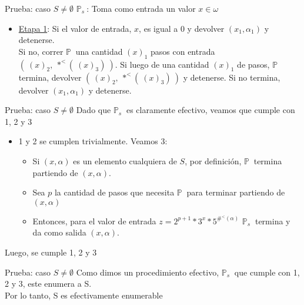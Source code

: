 \documentclass[10pt]{beamer}
\newcommand{\p}{\mathbb{P}}
\begin{document}
\begin{frame}{Prueba: caso $S \neq \emptyset$}
  \underline{$\p_{s}\ $}: Toma como entrada un valor $x \in \omega$
  \begin{itemize}[<+->]
    \item[ ] \underline{Etapa 1}: Si el valor de entrada, $x$, es igual a $0$
    y devolver $(x_{1}, \alpha_{1})$ y detenerse. \\
    Si no, correr $\p\ $ una cantidad $(x)_{1}$ pasos con entrada
    $(\ (x)_{2},\ *^{<}(\ (x)_{3})\ )$. Si luego de una cantidad $(x)_{1}$
    de pasos, $\p\ $ termina, devolver $(\ (x)_{2},\ *^{<}(\ (x)_{3})\ )$ y
    detenerse. Si no termina, devolver $(x_{1}, \alpha_{1})$ y detenerse.

  \end{itemize}
\end{frame}

\begin{frame}{Prueba: caso $S \neq \emptyset$}
  Dado que $\p_{s}\ $ es claramente efectivo, veamos que cumple con 1, 2 y 3
  \begin{itemize}[<+->]
    \item 1 y 2 se cumplen trivialmente. Veamos 3:
    \begin{itemize}[<+->]
      \item Si $(x, \alpha)$ es un elemento cualquiera de $S$, por definición,
      $\p\ $ termina partiendo de $(x, \alpha)$.
      \item Sea $p$ la cantidad de pasos que necesita $\p\ $ para terminar partiendo
      de $(x, \alpha)$
      \item Entonces, para el valor de entrada
      $z = 2^{p+1} * 3^{x} * 5^{\#^{<}(\alpha)}$ $\p_{s}\ $ termina y da como salida
      $(x, \alpha)$.
    \end{itemize}
  \end{itemize}
  Luego, se cumple 1, 2 y 3

\end{frame}


\begin{frame}{Prueba: caso $S \neq \emptyset$}
  Como dimos un procedimiento efectivo, $\p_{s}\ $ que cumple con 1, 2 y 3, este 
  enumera a S. \\
  Por lo tanto, S es efectivamente enumerable
\end{frame}
\end{document}
